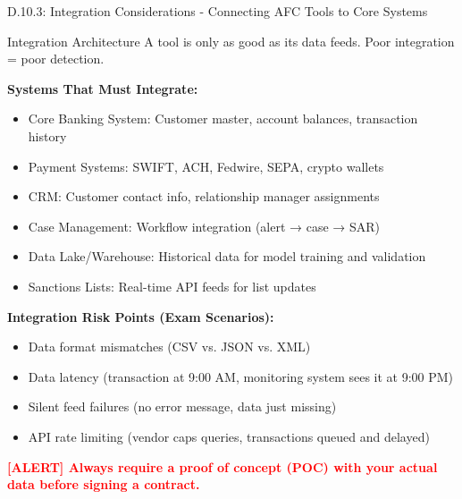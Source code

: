 \documentclass[11pt,a4paper]{beamer}
\newcommand{\redflag}[1]{\textcolor{red}{\textbf{[ALERT] #1}}}
\begin{document}
\begin{frame}{D.10.3: Integration Considerations - Connecting AFC Tools to Core Systems}
	\begin{block}{Integration Architecture}
		A tool is only as good as its data feeds. Poor integration = poor detection.
	\end{block}
	\textbf{Systems That Must Integrate:}
	\begin{itemize}
		\item Core Banking System: Customer master, account balances, transaction history
		\item Payment Systems: SWIFT, ACH, Fedwire, SEPA, crypto wallets
		\item CRM: Customer contact info, relationship manager assignments
		\item Case Management: Workflow integration (alert → case → SAR)
		\item Data Lake/Warehouse: Historical data for model training and validation
		\item Sanctions Lists: Real-time API feeds for list updates
	\end{itemize}
	\textbf{Integration Risk Points (Exam Scenarios):}
	\begin{itemize}
		\item Data format mismatches (CSV vs. JSON vs. XML)
		\item Data latency (transaction at 9:00 AM, monitoring system sees it at 9:00 PM)
		\item Silent feed failures (no error message, data just missing)
		\item API rate limiting (vendor caps queries, transactions queued and delayed)
	\end{itemize}
	\redflag{Always require a proof of concept (POC) with your actual data before signing a contract.}
\end{frame}
\end{document}
